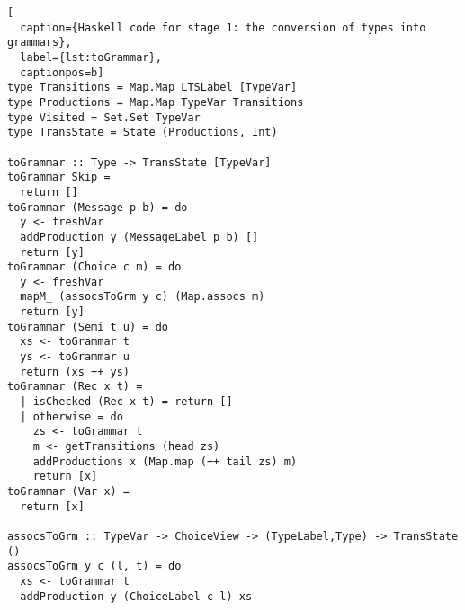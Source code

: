 \begin{lstlisting}[
  caption={Haskell code for stage 1: the conversion of types into grammars},
  label={lst:toGrammar},
  captionpos=b]
type Transitions = Map.Map LTSLabel [TypeVar]
type Productions = Map.Map TypeVar Transitions
type Visited = Set.Set TypeVar
type TransState = State (Productions, Int)

toGrammar :: Type -> TransState [TypeVar]
toGrammar Skip =
  return []
toGrammar (Message p b) = do
  y <- freshVar
  addProduction y (MessageLabel p b) []
  return [y]
toGrammar (Choice c m) = do
  y <- freshVar
  mapM_ (assocsToGrm y c) (Map.assocs m)
  return [y]
toGrammar (Semi t u) = do
  xs <- toGrammar t
  ys <- toGrammar u
  return (xs ++ ys)
toGrammar (Rec x t) =
  | isChecked (Rec x t) = return []
  | otherwise = do
    zs <- toGrammar t
    m <- getTransitions (head zs)
    addProductions x (Map.map (++ tail zs) m)
    return [x]
toGrammar (Var x) =
  return [x]

assocsToGrm :: TypeVar -> ChoiceView -> (TypeLabel,Type) -> TransState ()
assocsToGrm y c (l, t) = do
  xs <- toGrammar t
  addProduction y (ChoiceLabel c l) xs
\end{lstlisting}

